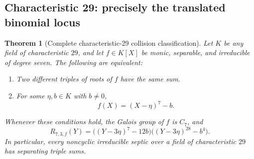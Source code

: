 \documentclass[11pt,a4paper]{article}
\newtheorem{theorem}{Theorem}[section]
\theoremstyle{definition}
\theoremstyle{remark}
\begin{document}
\subsection{Characteristic 29: precisely the translated binomial locus}

\begin{theorem}[Complete characteristic-29 collision classification]
\label{thm:29rigidity}
Let $K$ be any field of characteristic $29$, and let $f\in K[X]$ be monic,
separable, and irreducible of degree seven. The following are equivalent:
\begin{enumerate}[label=(\roman*)]
\item Two different triples of roots of $f$ have the same sum.
\item For some $\eta,b\in K$ with $b\neq0$,
\[
 f(X)=(X-\eta)^7-b.
\]
\end{enumerate}
Whenever these conditions hold, the Galois group of $f$ is $C_7$, and
\begin{equation}
 R_{7,3,f}(Y)=
 \bigl((Y-3\eta)^7-12b\bigr)
 \bigl((Y-3\eta)^{28}-b^4\bigr).
 \label{eq:29rigidfactor}
\end{equation}
In particular, every noncyclic irreducible septic over a field of
characteristic $29$ has separating triple sums.
\end{theorem}
\end{document}
